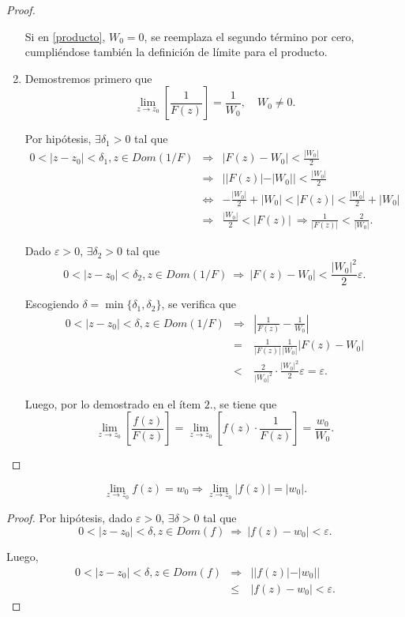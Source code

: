 \begin{proof}
\begin{enumerate}
Si en \eqref{producto}, $W_0 = 0$, se reemplaza el segundo término por cero, cumpliéndose también la definición de límite para el producto.

\item Demostremos primero que
$$\lim_{z \to z_0} \left[ \frac{1}{F(z)} \right] = \frac{1}{W_0}, \quad W_0 \neq 0. $$

Por hipótesis, $\exists \delta_1 >0$ tal que
\begin{eqnarray*}
0 < |z-z_0| < \delta_1, z \in Dom(1/F) &\Rightarrow & |F(z) -W_0| < \frac{|W_0|}{2} \\
& \Rightarrow & ||F(z)| - |W_0|| < \frac{|W_0|}{2} \\
& \Leftrightarrow &  - \frac{|W_0|}{2} + |W_0|    < |F(z)| < \frac{|W_0|}{2} + |W_0| \\
& \Rightarrow & \frac{|W_0|}{2} < |F(z)|  ~ \Rightarrow  \frac{1}{|F(z)|} < \frac{2}{|W_0|}.
\end{eqnarray*}

Dado $\varepsilon >0$, $\exists \delta_2 > 0$ tal que
$$0 < |z-z_0| < \delta_2, z \in Dom(1/F) ~ \Rightarrow ~  |F(z)-W_0| < \frac{|W_0|^2}{2} \varepsilon .$$

Escogiendo $\delta = \min \{\delta_1, \delta_2\}$, se verifica que
\begin{eqnarray*}
0 < |z-z_0| < \delta, z \in Dom(1/F) &\Rightarrow & \left| \frac{1}{F(z)} -\frac{1}{W_0}  \right| \\
&=& \frac{1}{|F(z)|} \frac{1}{|W_0|} |F(z) -W_0| \\
&< & \frac{2}{|W_0|^2} \cdot \frac{|W_0|^2}{2} \varepsilon  = \varepsilon . 
\end{eqnarray*}

Luego, por lo demostrado en el ítem $2.$, se tiene que
$$\lim_{z \to z_0} \left[ \frac{f(z)}{F(z)} \right] =\lim_{z \to z_0} \left[ f(z) \cdot \frac{1}{F(z)} \right] = \frac{w_0}{W_0}. $$
\end{enumerate}
\end{proof}

\begin{propo}
$$\lim_{z \to z_0} f(z) = w_0 \Rightarrow\lim_{z \to z_0} |f(z)| = |w_0|. $$
\end{propo}

\begin{proof}
Por hipótesis, dado $\varepsilon >0$, $\exists \delta >0$ tal que
$$0 < |z-z_0| < \delta, z \in Dom(f) ~\Rightarrow ~ |f(z) - w_0| < \varepsilon. $$

Luego,
\begin{eqnarray*}
0 < |z-z_0| < \delta, z \in Dom(f) &\Rightarrow & ||f(z)| - |w_0||  \\
&\leq & |f(z) -w_0| < \varepsilon.
\end{eqnarray*}
\end{proof}

